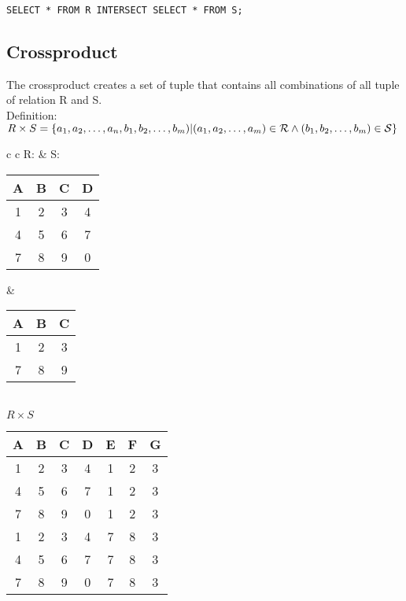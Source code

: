 \lstset{language=SQL,tabsize=4,captionpos=b,frame=single,
basicstyle=\footnotesize}
\begin{lstlisting}[caption=SQL Mean]
SELECT * FROM R INTERSECT SELECT * FROM S;
\end{lstlisting}

\subsection{Crossproduct}
The crossproduct creates a set of tuple that contains all combinations of all
tuple of relation R and S.\\
Definition: $R \times S = \{a_1, a_2, \dots, a_n, b_1, b_2, \dots, b_m) |\\
(a_1, a_2, \dots, a_m) \in \mathcal{R} \land (b_1, b_2, \dots, b_m) \in
\mathcal{S} \}$

\begin{tabular}{ c c}
	R: & S:\\
	\begin{tabular}{|c|c|c|c|}
		\hline
		A & B & C & D\\
		\hline
		1 & 2 & 3 & 4\\
		\hline
		4 & 5 & 6 & 7\\
		\hline
		7 & 8 & 9 & 0\\
		\hline
	\end{tabular} &

	\begin{tabular}{|c|c|c|}
		\hline
		A & B & C\\
		\hline
		1 & 2 & 3\\
		\hline
		7 & 8 & 9\\
		\hline
	\end{tabular}
\end{tabular}\\

\hspace{1cm}$R \times S$\\
\begin{tabular}{|c|c|c|c|c|c|c|}
	\hline
	A & B & C & D & E & F & G\\
	\hline
	1 & 2 & 3 & 4 & 1 & 2 & 3\\
	\hline
	4 & 5 & 6 & 7 & 1 & 2 & 3\\
	\hline
	7 & 8 & 9 & 0 & 1 & 2 & 3\\
	\hline
	1 & 2 & 3 & 4 & 7 & 8 & 3\\
	\hline
	4 & 5 & 6 & 7 & 7 & 8 & 3\\
	\hline
	7 & 8 & 9 & 0 & 7 & 8 & 3\\
	\hline
\end{tabular}


